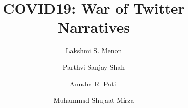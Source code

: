 \documentclass[USenglish,oneside,twocolumn]{article}
\begin{document}
  \author[1]{Lakshmi S. Menon}
  \author[2]{Parthvi Sanjay Shah}
  \author[3]{Anusha R. Patil}
  \author[4]{Muhammad Shujaat Mirza}
  
  
\title{COVID19: War of Twitter Narratives}

 


\maketitle









\end{document}
